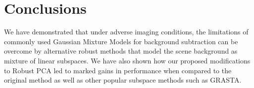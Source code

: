\documentclass{article}
\begin{document}
\section{Conclusions}
We have demonstrated that under adverse imaging conditions, the limitations of commonly used Gaussian Mixture Models for background subtraction can be overcome by alternative robust methods that model the scene background as mixture of linear subspaces. We have also shown how our proposed modifications to Robust PCA led to marked gains in performance when compared to the original method as well as other popular subspace methods such as GRASTA.












\end{document}
